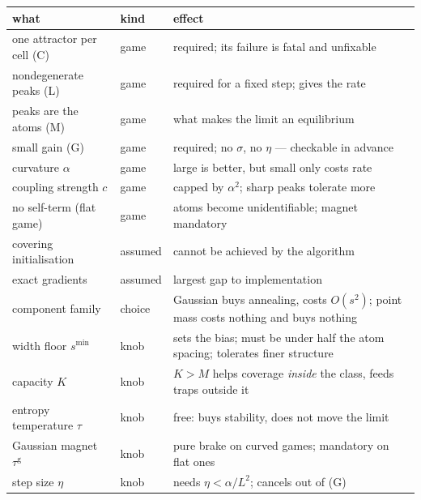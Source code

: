 \documentclass[11pt]{article}
\theoremstyle{definition}
\begin{document}
\begin{center}
\begin{tabular}{@{}p{}p{}p{}@{}}
\hline
what & kind & effect \\
\hline
one attractor per cell (C) & game & required; its failure is fatal and unfixable \\
nondegenerate peaks (L) & game & required for a fixed step; gives the rate \\
peaks are the atoms (M) & game & what makes the limit an equilibrium \\
small gain (G) & game & required; no $\sigma$, no $\eta$ --- checkable in advance \\
curvature $\alpha$ & game & large is better, but small only costs rate \\
coupling strength $c$ & game & capped by $\alpha^2$; sharp peaks tolerate more \\
no self-term (flat game) & game & atoms become unidentifiable; magnet mandatory \\
\hline
covering initialisation & assumed & cannot be achieved by the algorithm \\
exact gradients & assumed & largest gap to implementation \\
\hline
component family & choice & Gaussian buys annealing, costs $O(s^2)$; point mass costs nothing and buys nothing \\
width floor $s^{\min}$ & knob & sets the bias; must be under half the atom spacing; tolerates finer structure \\
capacity $K$ & knob & $K > M$ helps coverage \emph{inside} the class, feeds traps outside it \\
entropy temperature $\tau$ & knob & free: buys stability, does not move the limit \\
Gaussian magnet $\tau^{\mathrm g}$ & knob & pure brake on curved games; mandatory on flat ones \\
step size $\eta$ & knob & needs $\eta < \alpha/L^2$; cancels out of (G) \\
\hline
\end{tabular}
\end{center}
\end{document}

